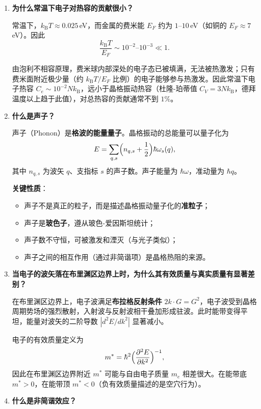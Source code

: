 \begin{enumerate}[label=\textbf{\arabic*.}, leftmargin=2em, itemsep=0.8em, resume]
\item \textbf{为什么常温下电子对热容的贡献很小？}

常温下，$k_{\text{B}}T \approx 0.025\,$eV，而金属的费米能 $E_F$ 约为 $1$--$10\,$eV（如铜的 $E_F \approx 7\,$eV）。因此
\[
    \frac{k_{\text{B}}T}{E_F} \sim 10^{-2}\text{--}10^{-3} \ll 1.
\]

由泡利不相容原理，费米球内部深处的电子态已被填满，无法被热激发；只有费米面附近极少量（约 $k_{\text{B}}T/E_F$ 比例）的电子能够参与热激发。因此常温下电子热容 $C_e \sim 10^{-2}Nk_{\text{B}}$，远小于晶格振动热容（杜隆-珀蒂值 $C_V = 3Nk_{\text{B}}$，德拜温度以上趋于此值），对总热容的贡献通常不到 $1\%$。

\item \textbf{什么是声子？}

声子（Phonon）是\textbf{格波的能量量子}。晶格振动的总能量可以量子化为
\[
    E = \sum_{q,s} \Bigl(n_{q,s} + \frac{1}{2}\Bigr)\hbar\omega_s(q),
\]
其中 $n_{q,s}$ 为波矢 $q$、支指标 $s$ 的声子数。声子能量为 $\hbar\omega$，准动量为 $\hbar q$。

\textbf{关键性质}：
\begin{itemize}[nosep]
    \item 声子不是真正的粒子，而是描述晶格振动量子化的\textbf{准粒子}；
    \item 声子是\textbf{玻色子}，遵从玻色-爱因斯坦统计；
    \item 声子数不守恒，可被激发和湮灭（与光子类似）；
    \item 声子之间的相互作用（通过非简谐项）是晶格热阻的来源。
\end{itemize}

\item \textbf{当电子的波矢落在布里渊区边界上时，为什么其有效质量与真实质量有显著差别？}

在布里渊区边界上，电子波满足\textbf{布拉格反射条件} $2k\cdot G = G^2$，电子波受到晶格周期势场的强烈散射，入射波与反射波相干叠加形成驻波。此时能带变得平坦，能量对波矢的二阶导数 $|d^2E/dk^2|$ 显著减小。

电子的有效质量定义为
\[
    m^* = \hbar^2 \Bigl(\frac{\partial^2 E}{\partial k^2}\Bigr)^{-1},
\]
因此在布里渊区边界附近 $m^*$ 可能与自由电子质量 $m_e$ 相差很大。在能带底 $m^* > 0$，在能带顶 $m^* < 0$（负有效质量描述的是空穴行为）。

\item \textbf{什么是非简谐效应？}


\end{enumerate}
